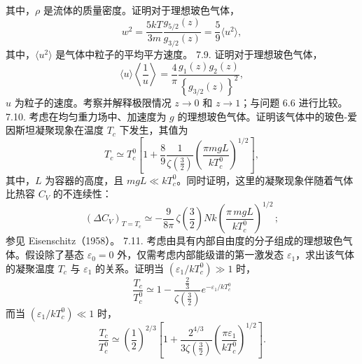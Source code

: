 其中，\(\rho\) 是流体的质量密度。证明对于理想玻色气体，
\begin{equation}\tag{7.5.51}\label{eq:7.5.51}
w ^{2} = \frac { 5 k T } { 3 m } \frac { g _ { 5 / 2 } ( z ) } { g _ { 3 / 2 } ( z ) } = \frac { 5 } { 9 } \langle u ^{2} \rangle ,
\end{equation}
其中，\(\langle u^{2}\rangle\) 是气体中粒子的平均平方速度。
7.9. 证明对于理想玻色气体，
\begin{equation}\tag{7.5.52}\label{eq:7.5.52}
\langle u \rangle \left\langle \frac { 1 } { u } \right\rangle = \frac { 4 } { \pi } \frac { g _ { 1 } ( z ) g _ { 2 } ( z ) } { \left\{ g _ { 3 / 2 } ( z ) \right\} ^{2} } ,
\end{equation}
\(u\) 为粒子的速度。考察并解释极限情况 \(z \rightarrow 0\) 和 \(z \rightarrow 1\)；与问题 6.6 进行比较。
7.10. 考虑在均匀重力场中、加速度为 \(g\) 的理想玻色气体。证明该气体中的玻色-爱因斯坦凝聚现象在温度 \(T_c\) 下发生，其值为
\begin{equation}\tag{7.5.53}\label{eq:7.5.53}
T _ { c } \simeq T _ { c } ^{0} \left[ 1 + \frac { 8 } { 9 } \frac { 1 } { \zeta \left( \frac { 3 } { 2 } \right) } \left( \frac { \pi m g L } { k T _ { c } ^{0} } \right) ^{1 / 2} \right] ,
\end{equation}
其中，\(L\) 为容器的高度，且 \(mgL \ll kT_{c}^{0}\)。同时证明，这里的凝聚现象伴随着气体比热容 \(C_{V}\) 的不连续性：
\begin{equation}\tag{7.5.54}\label{eq:7.5.54}
( \Delta C _ { V } ) _ { T = T _ { c } } \simeq - \frac { 9 } { 8 \pi } \, \zeta \left( \frac { 3 } { 2 } \right) N k \left( \frac { \pi \, m g L } { k T _ { c } ^{0} } \right) ^{1 / 2} \, ;
\end{equation}
参见 Eisenschitz（1958）。
7.11. 考虑由具有内部自由度的分子组成的理想玻色气体。假设除了基态 \(\varepsilon_0 = 0\) 外，仅需考虑内部能级谱的第一激发态 \(\varepsilon_1\)，求出该气体的凝聚温度 \(T_c\) 与 \(\varepsilon_1\) 的关系。证明当 \((\varepsilon_1/kT_c^0) \gg 1\) 时，
\begin{equation}\tag{7.5.55}\label{eq:7.5.55}
\frac { T _ { c } } { T _ { c } ^{0} } \simeq 1 - \frac { \frac { 2 } { 3 } } { \zeta \left( \frac { 3 } { 2 } \right) } e ^{- \varepsilon _ { 1} / k T _ { c } ^{0} }
\end{equation}
而当 \((\varepsilon_1/kT_c^0) \ll 1\) 时，
\begin{equation}\tag{7.5.56}\label{eq:7.5.56}
\frac { T _ { c } } { T _ { c } ^{0} } \simeq \left( \frac { 1 } { 2 } \right) ^{2 / 3} \left[ 1 + \frac { 2 ^{4 / 3} } { 3 \zeta \left( \frac { 3 } { 2 } \right) } \left( \frac { \pi \varepsilon _ { 1 } } { k T _ { c } ^{0} } \right) ^{1 / 2} \right] .
\end{equation}

